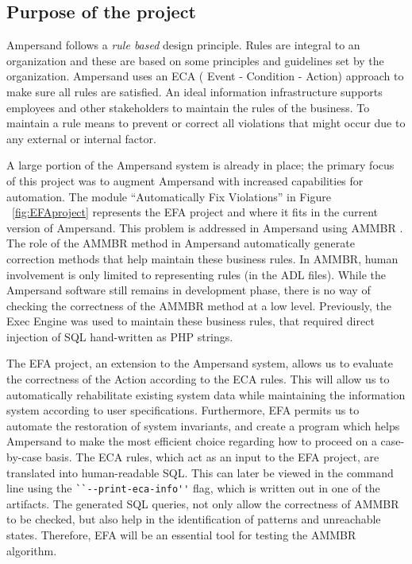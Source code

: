 %

\subsection{Purpose of the project}

Ampersand follows a \emph{rule based} design principle. Rules are integral to an organization
and these are based on some principles and guidelines set by the organization.
Ampersand uses an ECA ( Event - Condition - Action) approach to make sure all rules are satisfied. An ideal information infrastructure supports employees and other stakeholders to maintain the rules of the business. To maintain a rule means to prevent or correct all violations that might occur due to any external or internal factor.
 
 A large portion of the Ampersand system is already in place; the primary focus of this project was to
augment Ampersand with increased capabilities for automation. The module ``Automatically Fix Violations'' in Figure ~\ref{fig:EFAproject} represents the EFA project and where it fits in the current version of Ampersand.
This problem is addressed in Ampersand using AMMBR \citep{Ampersand}. The role of the AMMBR method in Ampersand automatically generate correction methods that help maintain these business rules. In AMMBR, human involvement is only limited to representing rules (in the ADL files). While the Ampersand software still remains in development phase, there is no way of checking the correctness of the AMMBR method at a low level. Previously, the Exec Engine was used to maintain these business rules, that required direct injection of SQL hand-written as PHP strings. 
 
The EFA project, an extension to the Ampersand system, allows us to evaluate 
the correctness of the Action according to the ECA rules. This will 
allow us to automatically rehabilitate existing system data while 
maintaining the information system according to user specifications. 
Furthermore, EFA permits us to automate the restoration of system invariants, 
and create a program which helps Ampersand to make the most efficient choice 
regarding how to proceed on a case-by-case basis. The ECA rules, which act as 
an 
input to the EFA project, are translated into human-readable SQL. This can 
later 
be viewed in the command line using the \verb|``--print-eca-info''| flag, which 
is written out in one of the artifacts. The generated SQL queries, not only 
allow  the correctness of AMMBR to be checked, but also help in the 
identification of patterns and unreachable states. Therefore, EFA will be an 
essential tool for testing the AMMBR algorithm.


